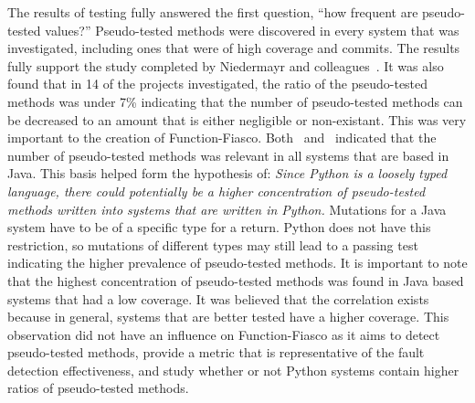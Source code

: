 The results of testing fully answered the first question, ``how frequent are pseudo-tested values?'' Pseudo-tested methods were discovered in every system that was investigated, including ones that were of high coverage and commits. The results fully support the study completed by Niedermayr and colleagues~\cite{niedermayr2016will}. It was also found that in 14 of the projects investigated, the ratio of the pseudo-tested methods was under 7\% indicating that the number of pseudo-tested methods can be decreased to an amount that is either negligible or non-existant. This was very important to the creation of Function-Fiasco. Both~\cite{niedermayr2016will} and~\cite{vera2017comprehensive} indicated that the number of pseudo-tested methods was relevant in all systems that are based in Java. This basis helped form the hypothesis of: \emph{Since Python is a loosely typed language, there could potentially be a higher concentration of pseudo-tested methods written into systems that are written in Python.} Mutations for a Java system have to be of a specific type for a return. Python does not have this restriction, so mutations of different types may still lead to a passing test indicating the higher prevalence of pseudo-tested methods. It is important to note that the highest concentration of pseudo-tested methods was found in Java based systems that had a low coverage. It was believed that the correlation exists because in general, systems that are better tested have a higher coverage. This observation did not have an influence on Function-Fiasco as it aims to detect pseudo-tested methods, provide a metric that is representative of the fault detection effectiveness, and study whether or not Python systems contain higher ratios of pseudo-tested methods.


